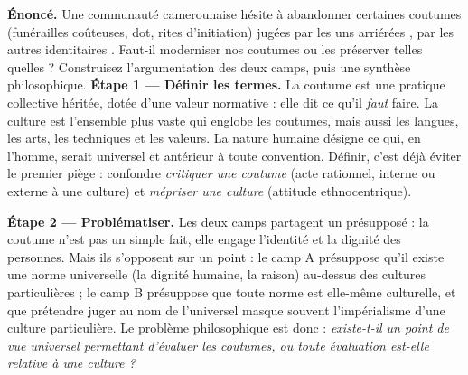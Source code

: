 \documentclass[11pt]{article}
\newcommand{\cle}[1]{{\popxbold\color{popdark}#1}}
\begin{document}
\begin{exoresolu}
\textbf{Énoncé.} Une communauté camerounaise hésite à abandonner certaines coutumes (funérailles coûteuses, dot, rites d'initiation) jugées par les uns \guillemotleft arriérées \guillemotright, par les autres \guillemotleft identitaires \guillemotright. Faut-il moderniser nos coutumes ou les préserver telles quelles ? Construisez l'argumentation des deux camps, puis une synthèse philosophique.
\tcblower
\textbf{Étape 1 — Définir les termes.} La \cle{coutume} est une pratique collective héritée, dotée d'une valeur normative : elle dit ce qu'il \emph{faut} faire. La \cle{culture} est l'ensemble plus vaste qui englobe les coutumes, mais aussi les langues, les arts, les techniques et les valeurs. La \cle{nature humaine} désigne ce qui, en l'homme, serait universel et antérieur à toute convention. Définir, c'est déjà éviter le premier piège : confondre \emph{critiquer une coutume} (acte rationnel, interne ou externe à une culture) et \emph{mépriser une culture} (attitude ethnocentrique).

\textbf{Étape 2 — Problématiser.} Les deux camps partagent un présupposé : la coutume n'est pas un simple fait, elle engage l'identité et la dignité des personnes. Mais ils s'opposent sur un point : le camp A présuppose qu'il existe une norme universelle (la dignité humaine, la raison) au-dessus des cultures particulières ; le camp B présuppose que toute norme est elle-même culturelle, et que prétendre juger au nom de l'universel masque souvent l'impérialisme d'une culture particulière. Le problème philosophique est donc : \emph{existe-t-il un point de vue universel permettant d'évaluer les coutumes, ou toute évaluation est-elle relative à une culture ?}


\end{exoresolu}
\end{document}
